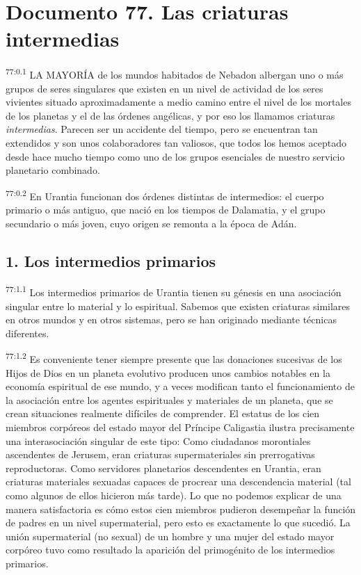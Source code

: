\chapter{Documento 77. Las criaturas intermedias}
\par
\textsuperscript{77:0.1} LA MAYORÍA de los mundos habitados de Nebadon albergan uno o más grupos de seres singulares que existen en un nivel de actividad de los seres vivientes situado aproximadamente a medio camino entre el nivel de los mortales de los planetas y el de las órdenes angélicas, y por eso los llamamos criaturas \textit{intermedias}. Parecen ser un accidente del tiempo, pero se encuentran tan extendidos y son unos colaboradores tan valiosos, que todos los hemos aceptado desde hace mucho tiempo como uno de los grupos esenciales de nuestro servicio planetario combinado.

\par
\textsuperscript{77:0.2} En Urantia funcionan dos órdenes distintas de intermedios: el cuerpo primario o más antiguo, que nació en los tiempos de Dalamatia, y el grupo secundario o más joven, cuyo origen se remonta a la época de Adán.

\section*{1. Los intermedios primarios}
\par
\textsuperscript{77:1.1} Los intermedios primarios de Urantia tienen su génesis en una asociación singular entre lo material y lo espiritual. Sabemos que existen criaturas similares en otros mundos y en otros sistemas, pero se han originado mediante técnicas diferentes.

\par
\textsuperscript{77:1.2} Es conveniente tener siempre presente que las donaciones sucesivas de los Hijos de Dios en un planeta evolutivo producen unos cambios notables en la economía espiritual de ese mundo, y a veces modifican tanto el funcionamiento de la asociación entre los agentes espirituales y materiales de un planeta, que se crean situaciones realmente difíciles de comprender. El estatus de los cien miembros corpóreos del estado mayor del Príncipe Caligastia ilustra precisamente una interasociación singular de este tipo: Como ciudadanos morontiales ascendentes de Jerusem, eran criaturas supermateriales sin prerrogativas reproductoras. Como servidores planetarios descendentes en Urantia, eran criaturas materiales sexuadas capaces de procrear una descendencia material (tal como algunos de ellos hicieron más tarde). Lo que no podemos explicar de una manera satisfactoria es cómo estos cien miembros pudieron desempeñar la función de padres en un nivel supermaterial, pero esto es exactamente lo que sucedió. La unión supermaterial (no sexual) de un hombre y una mujer del estado mayor corpóreo tuvo como resultado la aparición del primogénito de los intermedios primarios.

